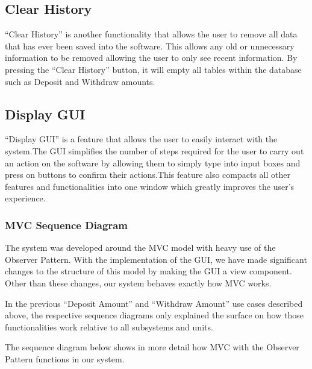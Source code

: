 \documentclass[12pt]{article}
\begin{document}
\subsection{Clear History}
“Clear History” is another functionality that allows the user to remove all data that has ever been saved into the software. This allows any old or unnecessary information to be removed allowing the user to only see recent information. By pressing the “Clear History” button, it will empty all tables within the database such as Deposit and Withdraw amounts.

\subsection{Display GUI}
“Display GUI” is a feature that allows the user to easily interact with the system.The GUI simplifies the number of steps required for the user to carry out an action on the software by allowing them to simply type into input boxes and press on buttons to confirm their actions.This feature also compacts all other features and functionalities into one window which greatly improves the user’s experience. 

\subsubsection{MVC Sequence Diagram}

The system was developed around the MVC model with heavy use of the Observer Pattern. With the implementation of the GUI, we have made significant changes to the structure of this model by making the GUI a view component. Other than these changes, our system behaves exactly how MVC works. 

In the previous “Deposit Amount” and “Withdraw Amount” use cases described above, the respective sequence diagrams only explained the surface on how those functionalities work relative to all subsystems and units.

The sequence diagram below shows in more detail how MVC with the Observer Pattern functions in our system.    
\end{document}
